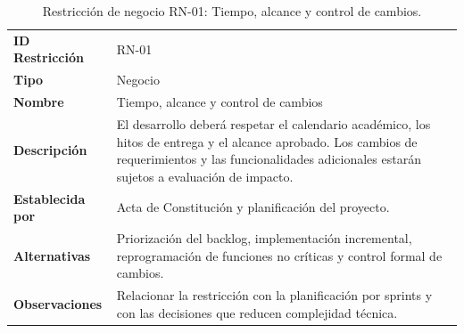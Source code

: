 \documentclass[11pt,a4paper,oneside]{article}
\begin{document}
\begingroup
\small
\setlength{\tabcolsep}{7pt}
\renewcommand{\arraystretch}{1.30}
\setlength{\anchoRegistro}{\dimexpr\textwidth-4\tabcolsep-3\arrayrulewidth\relax}
\begin{table}[H]
\centering
\caption{Restricción de negocio RN-01: Tiempo, alcance y control de cambios.}
\label{tab:restriccion-rn-01}
\begin{tabular}{|
>{\RaggedRight\arraybackslash}p{.28\anchoRegistro}|
>{\RaggedRight\arraybackslash}p{.72\anchoRegistro}|}
\hline
\rowcolor{negroTabla}
\multicolumn{2}{|l|}{\color{white}\bfseries Registro de Restricción de Negocio}\\\hline
\cellcolor{azulTabla}\bfseries ID Restricción
& RN-01\\\hline
\cellcolor{azulTabla}\bfseries Tipo
& Negocio\\\hline
\cellcolor{azulTabla}\bfseries Nombre
& Tiempo, alcance y control de cambios\\\hline
\cellcolor{azulTabla}\bfseries Descripción
& El desarrollo deberá respetar el calendario académico, los hitos de entrega y el alcance aprobado. Los cambios de requerimientos y las funcionalidades adicionales estarán sujetos a evaluación de impacto.\\\hline
\cellcolor{azulTabla}\bfseries Establecida por
& Acta de Constitución y planificación del proyecto.\\\hline
\cellcolor{azulTabla}\bfseries Alternativas
& Priorización del backlog, implementación incremental, reprogramación de funciones no críticas y control formal de cambios.\\\hline
\cellcolor{azulTabla}\bfseries Observaciones
& Relacionar la restricción con la planificación por sprints y con las decisiones que reducen complejidad técnica.\\\hline
\end{tabular}
\end{table}
\endgroup
\end{document}

